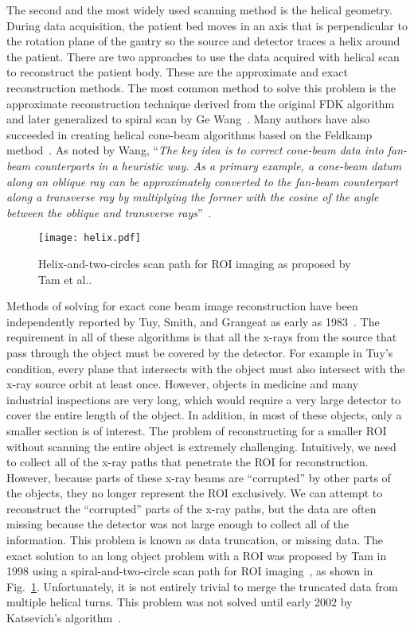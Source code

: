 The second and the most widely used scanning method is the helical geometry.  During data acquisition, the patient bed moves in an axis that is perpendicular to the rotation plane of the gantry so the source and detector traces a helix around the patient.  There are two approaches to use the data acquired with helical scan to reconstruct the patient body.  These are the approximate and exact reconstruction methods.  The most common method to solve this problem is the approximate reconstruction technique derived from the original FDK algorithm and later generalized to spiral scan by Ge Wang~\citep{Wang1993}.  Many authors have also succeeded in creating helical cone-beam algorithms based on the Feldkamp method~\citep{Wang1992, Kudo1991, Yan1992, Smith1992, Noo1999, Kachelriess2000, Tang2004, Tang2006a, Tang2006b}.  As noted by Wang, ``\textit{The key idea is to correct cone-beam data into fan-beam counterparts in a heuristic way.  As a primary example, a cone-beam datum along an oblique ray can be approximately converted to the fan-beam counterpart along a transverse ray by multiplying the former with the cosine of the angle between the oblique and transverse rays}''~\citep{Wang2007}.

%
\begin{figure}[h]
\texttt{[image: helix.pdf]}
\caption{Helix-and-two-circles scan path for ROI imaging as proposed by Tam et al..}
\label{fig:tam_circle}
\end{figure}
%

Methods of solving for exact cone beam image reconstruction have been independently reported by Tuy, Smith, and Grangeat as early as 1983~\citep{Tuy1983, Smith1985, Grangeat1991}.  The requirement in all of these algorithms is that all the x-rays from the source that pass through the object must be covered by the detector.  For example in Tuy's condition, every plane that intersects with the object must also intersect with the x-ray source orbit at least once.  However, objects in medicine and many industrial inspections are very long, which would require a very large detector to cover the entire length of the object.  In addition, in most of these objects, only a smaller section is of interest.  The problem of reconstructing for a smaller ROI without scanning the entire object is extremely challenging.  Intuitively, we need to collect all of the x-ray paths that penetrate the ROI for reconstruction.  However, because parts of these x-ray beams are ``corrupted'' by other parts of the objects, they no longer represent the ROI exclusively.  We can attempt to reconstruct the ``corrupted'' parts of the x-ray paths, but the data are often missing because the detector was not large enough to collect all of the information.  This problem is known as data truncation, or missing data.  The exact solution to an long object problem with a ROI was proposed by Tam in 1998 using a spiral-and-two-circle scan path for ROI imaging~\citep{Tam1998}, as shown in Fig.~\ref{fig:tam_circle}.  Unfortunately, it is not entirely trivial to merge the truncated data from multiple helical turns.  This problem was not solved until early 2002 by Katsevich's algorithm~\citep{Katsevich2002SIAM, Katsevich2003, Katsevich2004}.

